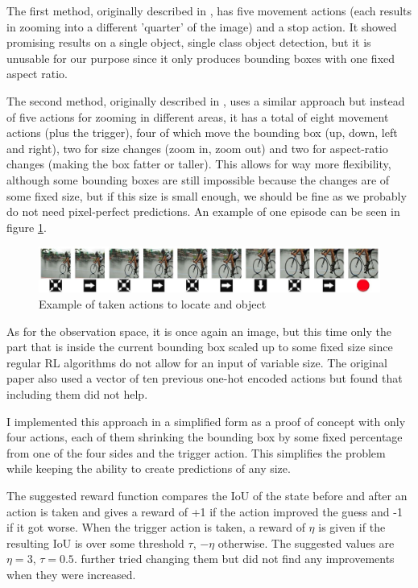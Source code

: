 \documentclass[
  digital,     %
  oneside,     %
  nosansbold,  %
  nocolorbold, %
  lof,         %
  lot,         %
]{fithesis4}
\begin{document}
The first method, originally described in \cite{hierarchical_od_with_drl}, has five movement actions (each results in zooming into a different 'quarter' of the image) and a stop action. It showed promising results on a single object, single class object detection, but it is unusable for our purpose since it only produces bounding boxes with one fixed aspect ratio.

The second method, originally described in \cite{iterative_od_with_rl}, uses a similar approach but instead of five actions for zooming in different areas, it has a total of eight movement actions (plus the trigger), four of which move the bounding box (up, down, left and right), two for size changes (zoom in, zoom out) and two for aspect-ratio changes (making the box fatter or taller). This allows for way more flexibility, although some bounding boxes are still impossible because the changes are of some fixed size, but if this size is small enough, we should be fine as we probably do not need pixel-perfect predictions. An example of one episode can be seen in figure \ref{fig:exmaple_from_paper}.

\begin{figure}
    \centering
    \includegraphics[width=1\linewidth]{diagrams/45.jpg}
    \caption{Example of taken actions to locate and object \cite{iterative_od_with_rl}}
    \label{fig:exmaple_from_paper}
\end{figure}

As for the observation space, it is once again an image, but this time only the part that is inside the current bounding box scaled up to some fixed size since regular RL algorithms do not allow for an input of variable size. The original paper \cite{iterative_od_with_rl} also used a vector of ten previous one-hot encoded actions but \cite{rl_object_detection} found that including them did not help.

I implemented this approach in a simplified form as a proof of concept with only four actions, each of them shrinking the bounding box by some fixed percentage from one of the four sides and the trigger action. This simplifies the problem while keeping the ability to create predictions of any size.

The suggested reward function compares the IoU of the state before and after an action is taken and gives a reward of +1 if the action improved the guess and -1 if it got worse. When the trigger action is taken, a reward of $\eta$ is given if the resulting IoU is over some threshold $\tau$, $-\eta$ otherwise. The suggested values are $\eta=3$, $\tau=0.5$. \cite{rl_object_detection} further tried changing them but did not find any improvements when they were increased.
\end{document}
